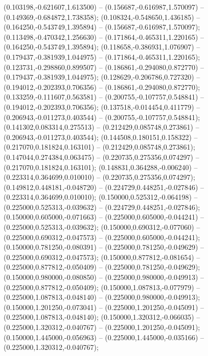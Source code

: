  (0.103198,-0.621607,1.613500) -- (0.156687,-0.616987,1.570097) -- (0.149369,-0.684872,1.738358);
 (0.108324,-0.548650,1.436185) -- (0.164250,-0.543749,1.395894) -- (0.156687,-0.616987,1.570097);
 (0.113498,-0.470342,1.256630) -- (0.171864,-0.465311,1.220165) -- (0.164250,-0.543749,1.395894);
 (0.118658,-0.386931,1.076907) -- (0.179437,-0.381939,1.044975) -- (0.171864,-0.465311,1.220165);
 (0.123731,-0.298860,0.899507) -- (0.186861,-0.294080,0.872770) -- (0.179437,-0.381939,1.044975);
 (0.128629,-0.206786,0.727320) -- (0.194012,-0.202393,0.706356) -- (0.186861,-0.294080,0.872770);
 (0.133259,-0.111607,0.563581) -- (0.200755,-0.107757,0.548841) -- (0.194012,-0.202393,0.706356);
 (0.137518,-0.014454,0.411779) -- (0.206943,-0.011273,0.403544) -- (0.200755,-0.107757,0.548841);
 (0.141302,0.083314,0.275513) -- (0.212429,0.085748,0.273861) -- (0.206943,-0.011273,0.403544);
 (0.144508,0.180151,0.158322) -- (0.217070,0.181824,0.163101) -- (0.212429,0.085748,0.273861);
 (0.147044,0.274384,0.063475) -- (0.220735,0.275356,0.074297) -- (0.217070,0.181824,0.163101);
 (0.148831,0.364288,-0.006240) -- (0.223314,0.364699,0.010010) -- (0.220735,0.275356,0.074297);
 (0.149812,0.448181,-0.048720) -- (0.224729,0.448251,-0.027846) -- (0.223314,0.364699,0.010010);
 (0.150000,0.525312,-0.064198) -- (0.225000,0.525313,-0.039632) -- (0.224729,0.448251,-0.027846);
 (0.150000,0.605000,-0.071663) -- (0.225000,0.605000,-0.044241) -- (0.225000,0.525313,-0.039632);
 (0.150000,0.690312,-0.077060) -- (0.225000,0.690312,-0.047573) -- (0.225000,0.605000,-0.044241);
 (0.150000,0.781250,-0.080391) -- (0.225000,0.781250,-0.049629) -- (0.225000,0.690312,-0.047573);
 (0.150000,0.877812,-0.081654) -- (0.225000,0.877812,-0.050409) -- (0.225000,0.781250,-0.049629);
 (0.150000,0.980000,-0.080850) -- (0.225000,0.980000,-0.049913) -- (0.225000,0.877812,-0.050409);
 (0.150000,1.087813,-0.077979) -- (0.225000,1.087813,-0.048140) -- (0.225000,0.980000,-0.049913);
 (0.150000,1.201250,-0.073041) -- (0.225000,1.201250,-0.045091) -- (0.225000,1.087813,-0.048140);
 (0.150000,1.320312,-0.066035) -- (0.225000,1.320312,-0.040767) -- (0.225000,1.201250,-0.045091);
 (0.150000,1.445000,-0.056963) -- (0.225000,1.445000,-0.035166) -- (0.225000,1.320312,-0.040767);
